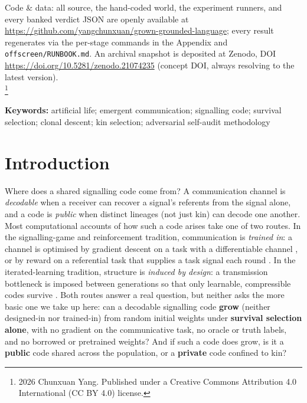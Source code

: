 \documentclass[12pt,letterpaper]{article}
\newcommand\blfootnote[1]{%
  \begingroup
  \renewcommand\thefootnote{}\footnote{#1}%
  \addtocounter{footnote}{-1}%
  \endgroup
}
\begin{document}
Code \& data: all source, the hand-coded world, the experiment runners, and every banked verdict JSON are openly available at \url{https://github.com/yangchunxuan/grown-grounded-language}; every result regenerates via the per-stage commands in the Appendix and \texttt{offscreen/RUNBOOK.md}. An archival snapshot is deposited at Zenodo, DOI \url{https://doi.org/10.5281/zenodo.21074235} (concept DOI, always resolving to the latest version).\\
\blfootnote{\textcopyright{} 2026 Chunxuan Yang. Published under a Creative Commons Attribution 4.0 International (CC BY 4.0) license.}

\textbf{Keywords:} artificial life; emergent communication; signalling code; survival selection; clonal descent; kin selection; adversarial self-audit methodology

\section{Introduction}

Where does a shared signalling code come from? A communication channel is \emph{decodable}
when a receiver can recover a signal's referents from the signal alone, and a code is
\emph{public} when distinct lineages (not just kin) can decode one another. Most
computational accounts of how such a code arises take one of two routes. In the
signalling-game and reinforcement tradition, communication is \emph{trained in}: a channel
is optimised by gradient descent on a task with a differentiable channel
\citep{foerster2016}, or by reward on a referential task that supplies a task signal each
round \citep{lazaridou2017}. In the iterated-learning tradition, structure is \emph{induced
by design}: a transmission bottleneck is imposed between generations so that only learnable,
compressible codes survive \citep{kirby2008}. Both routes answer a real question,
but neither asks the more basic one we take up here: can a decodable signalling code
\textbf{grow} (neither designed-in nor trained-in) from random initial weights under
\textbf{survival selection alone}, with no gradient on the communicative task, no oracle or
truth labels, and no borrowed or pretrained weights? And if such a code does grow, is it a
\textbf{public} code shared across the population, or a \textbf{private} code confined to
kin?
\end{document}

